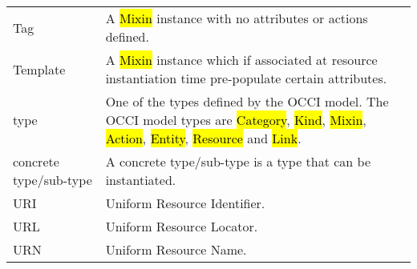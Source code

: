 \begin{tabular}{l|p{12cm}}
Tag & A \hl{Mixin} instance with no attributes or actions defined. \\

Template & A \hl{Mixin} instance which if associated at resource instantiation
time pre-populate certain attributes. \\

type & One of the types defined by the OCCI model.  The OCCI model types are
 \hl{Category}, \hl{Kind}, \hl{Mixin}, \hl{Action}, \hl{Entity}, \hl{Resource}
 and \hl{Link}. \\
 
concrete type/sub-type & A concrete type/sub-type is a type that can be instantiated.\\

URI & Uniform Resource Identifier. \\
URL & Uniform Resource Locator. \\
URN & Uniform Resource Name. \\
\end{tabular}
